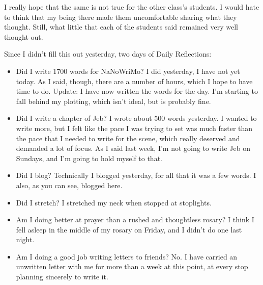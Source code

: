 \documentclass[12pt]{article}[titlepage]
\newcommand{\1}{\={a}}
\newcommand{\2}{\={e}}
\newcommand{\3}{\={\i}}
\newcommand{\4}{\=o}
\newcommand{\5}{\=u}
\newcommand{\6}{\={A}}
\renewcommand{\,}{\textsuperscript{,}}
\begin{document}
I really hope that the same is not true for the other class's students.
I would hate to think that my being there made them uncomfortable sharing what they thought.
Still, what little that each of the students said remained very well thought out.

Since I didn't fill this out yesterday, two days of Daily Reflections:
\begin{itemize}
\item Did I write 1700 words for NaNoWriMo? I did yesterday, I have not yet today. As I said, though, there are a number of hours, which I hope to have time to do.
Update: I have now written the words for the day.
I'm starting to fall behind my plotting, which isn't ideal, but is probably fine.
\item Did I write a chapter of Jeb? I wrote about 500 words yesterday.
I wanted to write more, but I felt like the pace I was trying to set was much faster than the pace that I needed to write for the scene, which really deserved and demanded a lot of focus.
As I said last week, I'm not going to write Jeb on Sundays, and I'm going to hold myself to that.
\item Did I blog? Technically I blogged yesterday, for all that it was a few words.
I also, as you can see, blogged here.
\item Did I stretch? I stretched my neck when stopped at stoplights.
\item Am I doing better at prayer than a rushed and thoughtless rosary? I think I fell asleep in the middle of my rosary on Friday, and I didn't do one last night.
\item Am I doing a good job writing letters to friends? No. I have carried an unwritten letter with me for more than a week at this point, at every stop planning sincerely to write it.
\end{itemize}
\end{document}
